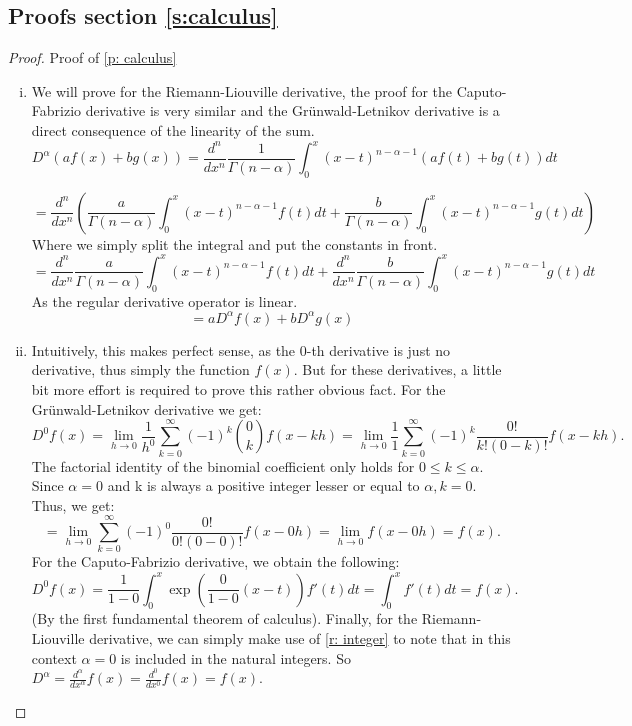 \subsection{Proofs section \ref{s:calculus}}\label{pf:calculus}

\begin{proof}
    Proof of \ref{p: calculus}
    \begin{enumerate}[(i)]
        \item We will prove for the Riemann-Liouville derivative, the proof for the Caputo-Fabrizio derivative is very similar and the Grünwald-Letnikov derivative is a direct consequence of the linearity of the sum.
        \[ D^{\alpha} (a f(x) + b g(x)) = \frac{d^n}{dx^n}\frac{1}{\Gamma(n - \alpha)} \int_{0}^{x} (x - t)^{n - \alpha - 1} \left(a f(t) + b g(t)\right) dt \]
     
        \[= \frac{d^n}{dx^n}\left(\frac{a}{\Gamma(n - \alpha)} \int_{0}^{x} (x - t)^{n - \alpha - 1}  f(t)dt + \frac{b}{\Gamma(n - \alpha)} \int_{0}^{x} (x - t)^{n - \alpha - 1} g(t)dt\right) \] Where we simply split the integral and put the constants in front.
        \[= \frac{d^n}{dx^n}\frac{a}{\Gamma(n - \alpha)} \int_{0}^{x} (x - t)^{n - \alpha - 1}  f(t)dt + \frac{d^n}{dx^n} \frac{b}{\Gamma(n - \alpha)} \int_{0}^{x} (x - t)^{n - \alpha - 1} g(t)dt \] As the regular derivative operator is linear.
        \[ = a D^{\alpha} f(x) + b D^{\alpha} g(x) \]
        \item Intuitively, this makes perfect sense, as the 0-th derivative is just no derivative, thus simply the function \(f(x)\). But for these derivatives, a little bit more effort is required to prove this rather obvious fact.
        \newline 
        For the Grünwald-Letnikov derivative we get: \[D^0 f(x) = \lim_{h \to 0} \frac{1}{h^0} \sum_{k=0}^\infty (-1)^k \binom{0}{k} f(x - k h)
        = \lim_{h \to 0} \frac{1}{1} \sum_{k=0}^\infty (-1)^k \frac{0!}{k!(0- k)!} f(x - k h).\] The factorial identity of the binomial coefficient only holds for \(0 \leq k \leq \alpha\). Since \(\alpha = 0\) and k is always a positive integer lesser or equal to \(\alpha, k = 0\). Thus, we get:
        \[ = \lim_{h \to 0} \sum_{k=0}^\infty (-1)^0 \frac{0!}{0!(0- 0)!} f(x - 0 h) = \lim_{h \to 0} f(x - 0 h) = f(x).\]
        \newline
        For the Caputo-Fabrizio derivative, we obtain the following:
        \[ D^{0} f(x) = \frac{1}{1 - 0}  \int_{0}^{x} \exp\left(\frac{0}{1 -0}(x-t)\right) f'(t) dt = \int_{0}^{x}f'(t) dt = f(x) .\]
        (By the first fundamental theorem of calculus).
        \newline
        Finally, for the Riemann-Liouville derivative, we can simply make use of \ref{r: integer} to note that in this context \(\alpha = 0\) is included in the natural integers. So \( \displaystyle D^\alpha = \frac{d^\alpha}{dx^\alpha} f(x) = \frac{d^0}{dx^0} f(x) = f(x)\). 


\end{enumerate}
\end{proof}
